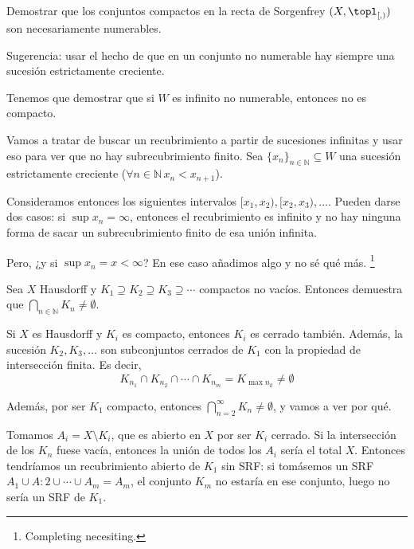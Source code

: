 \begin{problem}[16] Demostrar que los conjuntos compactos en la recta de Sorgenfrey $(X, \topl_{[,)})$ son necesariamente numerables.

Sugerencia: usar el hecho de que en un conjunto no numerable hay siempre una sucesión estrictamente creciente.
\solution

Tenemos que demostrar que si $W$ es infinito no numerable, entonces no es compacto.

Vamos a tratar de buscar un recubrimiento a partir de sucesiones infinitas y usar eso para ver que no hay subrecubrimiento finito. Sea $\{ x_n\}_{n∈ℕ} ⊆ W$ una sucesión estrictamente creciente ($∀n ∈ ℕ\, x_n < x_{n+1}$).

Consideramos entonces los siguientes intervalos $[x_1, x_2), [x_2, x_3), \dotsc$. Pueden darse dos casos: si $\sup x_n = ∞$, entonces el recubrimiento es infinito y no hay ninguna forma de sacar un subrecubrimiento finito de esa unión infinita.

Pero, ¿y si $\sup x_n = x < ∞$? En ese caso añadimos algo y no sé qué más. \footnote{Completing necesiting.}

\end{problem}

\begin{problem}[17] Sea $X$ Hausdorff y $K_1 ⊇K_2 ⊇ K_3 ⊇ \dotsb $ compactos no vacíos. Entonces demuestra que $\bigcap_{n∈ℕ} K_n ≠ ∅$.
\solution

Si $X$ es Hausdorff y $K_i$ es compacto, entonces $K_i$ es cerrado también. Además, la sucesión $K_2, K_3, \dotsc$ son subconjuntos cerrados de $K_1$ con la propiedad de intersección finita.  Es decir, \[ K_{n_1} ∩ K_{n_2} ∩ \dotsb ∩ K_{n_m}  = K_{\max n_k} ≠ ∅\]

Además, por ser $K_1$ compacto, entonces $\bigcap_{n=2}^∞ K_n ≠ ∅$, y vamos a ver por qué.

Tomamos $A_i = X \setminus K_i$, que es abierto en $X$ por ser $K_i$ cerrado. Si la intersección de los $K_n$ fuese vacía, entonces la unión de todos los $A_i$ sería el total $X$. Entonces tendríamos un recubrimiento abierto de $K_1$ sin SRF: si tomásemos un SRF $A_1 ∪ A:2 ∪ \dotsb ∪ A_m = A_m$, el conjunto $K_m$ no estaría en ese conjunto, luego no sería un SRF de $K_1$.
\end{problem}


